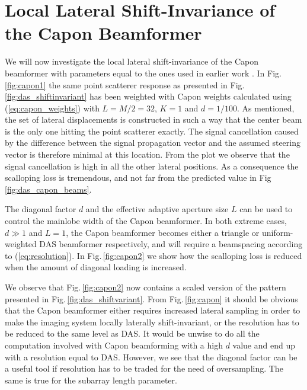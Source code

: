 \documentclass[journal]{IEEEtran}
\begin{document}
\section{Local Lateral Shift-Invariance of the Capon Beamformer}\label{sec:capon_LLSI}
We will now investigate the local lateral shift-invariance of the Capon beamformer with parameters equal to the ones used in earlier work \cite{Synnevag2009, Asen}. In Fig.\,\ref{fig:capon1} the same point scatterer response as presented in Fig.\,\ref{fig:das_shiftinvariant} has been weighted with Capon weights calculated using (\ref{eq:capon_weights}) with $L = M/2 = 32$, $K=1$ and $d=1/100$. As mentioned, the set of lateral displacements is constructed in such a way that the center beam is the only one hitting the point scatterer exactly. The signal cancellation caused by the difference between the signal propagation vector and the assumed steering vector is therefore minimal at this location. From the plot we observe that the signal cancellation is high in all the other lateral positions. As a consequence the scalloping loss is tremendous, and not far from the predicted value in Fig\,\ref{fig:das_capon_beams}. %

The diagonal factor $d$ and the effective adaptive aperture size $L$ can be used to control the mainlobe width of the Capon beamformer. In both extreme cases, $d\gg1$ and $L=1$, the Capon beamformer becomes either a triangle or uniform-weighted DAS beamformer respectively, and will require a beamspacing according to (\ref{eq:resolution}). In Fig.\,\ref{fig:capon2} we show how the scalloping loss is reduced when the amount of diagonal loading is increased. 

We observe that Fig.\,\ref{fig:capon2} now contains a scaled version of the pattern presented in Fig.\,\ref{fig:das_shiftvariant}. From Fig.\,\ref{fig:capon} it should be obvious that the Capon beamformer either requires increased lateral sampling in order to make the imaging system locally laterally shift-invariant, or the resolution has to be reduced to the same level as DAS. It would be unwise to do all the computation involved with Capon beamforming with a high $d$ value and end up with a resolution equal to DAS. However, we see that the diagonal factor can be a useful tool if resolution has to be traded for the need of oversampling. The same is true for the subarray length parameter.
  
\end{document}
